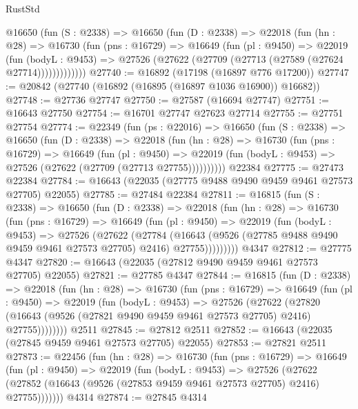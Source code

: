 \begin{lexlean}{RustStd}
\begin{coremodule}
      @16650
        (fun (S : @2338) =>
        @16650
          (fun (D : @2338) =>
          @22018
            (fun (hn : @28) =>
            @16730
              (fun (pns : @16729) =>
              @16649
                (fun (pl : @9450) =>
                @22019
                  (fun (bodyL : @9453) =>
                  @27526 (@27622 (@27709 (@27713 (@27589 (@27624 @27714)))))))))))))
@27740 := @16892 (@17198 (@16897 @776 @17200))
@27747 := @20842 (@27740 (@16892 (@16895 (@16897 @1036 @16900)) @16682))
@27748 := @27736 @27747
@27750 := @27587 (@16694 @27747)
@27751 := @16643 @27750
@27754 := @16701 @27747 @27623 @27714
@27755 := @27751 @27754
@27774 := @22349
    (fun (ps : @22016) =>
    @16650
      (fun (S : @2338) =>
      @16650
        (fun (D : @2338) =>
        @22018
          (fun (hn : @28) =>
          @16730
            (fun (pns : @16729) =>
            @16649
              (fun (pl : @9450) =>
              @22019 (fun (bodyL : @9453) => @27526 (@27622 (@27709 (@27713 @27755))))))))))
    @22384
@27775 := @27473 @22384
@27784 := @16643 (@22035 (@27775 @9488 @9490 @9459 @9461 @27573 @27705) @22055)
@27785 := @27484 @22384
@27811 := @16815
    (fun (S : @2338) =>
    @16650
      (fun (D : @2338) =>
      @22018
        (fun (hn : @28) =>
        @16730
          (fun (pns : @16729) =>
          @16649
            (fun (pl : @9450) =>
            @22019
              (fun (bodyL : @9453) =>
              @27526
                (@27622
                  (@27784
                    (@16643
                      (@9526 (@27785 @9488 @9490 @9459 @9461 @27573 @27705) @2416)
                      @27755)))))))))
    @4347
@27812 := @27775 @4347
@27820 := @16643 (@22035 (@27812 @9490 @9459 @9461 @27573 @27705) @22055)
@27821 := @27785 @4347
@27844 := @16815
    (fun (D : @2338) =>
    @22018
      (fun (hn : @28) =>
      @16730
        (fun (pns : @16729) =>
        @16649
          (fun (pl : @9450) =>
          @22019
            (fun (bodyL : @9453) =>
            @27526
              (@27622
                (@27820
                  (@16643 (@9526 (@27821 @9490 @9459 @9461 @27573 @27705) @2416) @27755))))))))
    @2511
@27845 := @27812 @2511
@27852 := @16643 (@22035 (@27845 @9459 @9461 @27573 @27705) @22055)
@27853 := @27821 @2511
@27873 := @22456
    (fun (hn : @28) =>
    @16730
      (fun (pns : @16729) =>
      @16649
        (fun (pl : @9450) =>
        @22019
          (fun (bodyL : @9453) =>
          @27526
            (@27622 (@27852 (@16643 (@9526 (@27853 @9459 @9461 @27573 @27705) @2416) @27755)))))))
    @4314
@27874 := @27845 @4314

\end{coremodule}
\end{lexlean}
